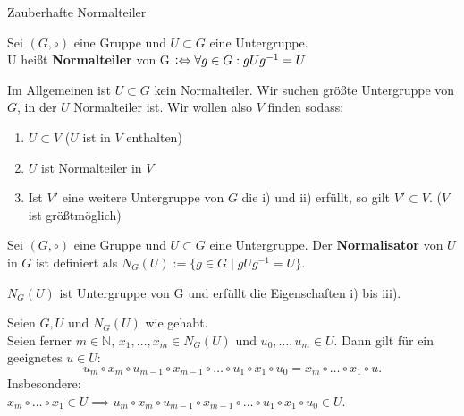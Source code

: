 \documentclass[a4paper]{article}
\newcommand{\N}{\mathbb{N}}
\newcommand\logeq{\mathrel{\raisebox{.66pt}{:}}\Leftrightarrow}
\begin{document}
\thispagestyle{ErsteSeite} 
\begin{center}
    \huge{\selectfont Zauberhafte Normalteiler}
\end{center}
\hspace{10mm}
\begin{definition}[1.1]
        Sei $(G, \circ)$ eine Gruppe und $U \subset G$ eine Untergruppe. \\
        U heißt \textbf{Normalteiler} von G $\logeq \forall g \in G: g U g^{-1} = U $
\end{definition}

\begin{bemerkung}
Im Allgemeinen ist $U \subset G$ kein Normalteiler. Wir suchen größte Untergruppe von $G$, in der $U$ Normalteiler ist. Wir wollen also $V$ finden sodass:
\begin{enumerate}
        \item $U \subset V$ ($U$ ist in $V$ enthalten)
        \item $U$ ist Normalteiler in $V$
        \item Ist $V'$ eine weitere Untergruppe von $G$ die i) und ii) erfüllt, so gilt $V' \subset V$. ($V$ ist größtmöglich)
    \end{enumerate}
\end{bemerkung}

\begin{definition}[2.2]
        Sei $(G, \circ)$ eine Gruppe und $U \subset G$ eine Untergruppe. Der \textbf{Normalisator} von $U$ in $G$ ist definiert als 
          $N_G(U) := \{g \in G  \mid g U g^{-1} = U\}$.
\end{definition}
\begin{satz}[2.3]
        $N_G(U)$ ist Untergruppe von G und erfüllt die Eigenschaften i) bis iii).
    \end{satz}

\begin{satz}[2.4]
        Seien $G, U$ und $N_G(U)$ wie gehabt. \\
        Seien ferner $m \in \N$, $x_1, \ldots, x_m \in N_G(U)$ und $u_0, \ldots, u_m \in U$. Dann gilt für ein geeignetes $u \in U$:
        \[
            u_m \circ x_m \circ u_{m-1} \circ x_{m-1} \circ \ldots \circ u_1 \circ x_1 \circ u_0 = x_m \circ \ldots \circ  x_1 \circ u
        .\] 
        Insbesondere: \\
        $x_m \circ \ldots \circ x_1 \in U \implies u_m \circ x_m \circ u_{m-1} \circ x_{m-1} \circ \ldots \circ u_1 \circ x_1 \circ u_0 \in U$.
    \end{satz}
    
\end{document}
